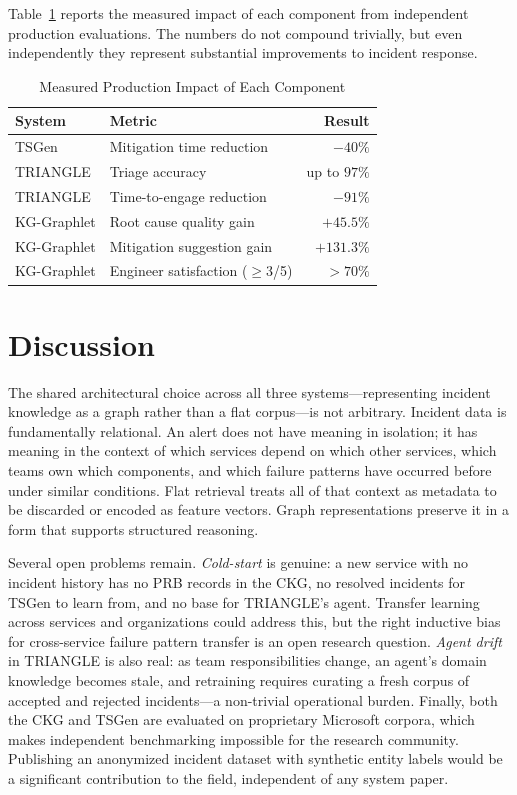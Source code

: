 \documentclass[conference]{IEEEtran}
\begin{document}
Table~\ref{tab:impact} reports the measured impact of each component from
independent production evaluations. The numbers do not compound trivially, but
even independently they represent substantial improvements to incident response.

\begin{table}[h]
\caption{Measured Production Impact of Each Component}
\label{tab:impact}
\centering
\begin{tabular}{lp{3.2cm}r}
\toprule
\textbf{System} & \textbf{Metric} & \textbf{Result} \\
\midrule
TSGen       & Mitigation time reduction  & $-40\%$ \\
TRIANGLE    & Triage accuracy            & up to $97\%$ \\
TRIANGLE    & Time-to-engage reduction   & $-91\%$ \\
KG-Graphlet & Root cause quality gain    & $+45.5\%$ \\
KG-Graphlet & Mitigation suggestion gain & $+131.3\%$ \\
KG-Graphlet & Engineer satisfaction ($\geq$3/5) & $>70\%$ \\
\bottomrule
\end{tabular}
\end{table}


\section{Discussion}

The shared architectural choice across all three systems---representing incident
knowledge as a graph rather than a flat corpus---is not arbitrary. Incident data
is fundamentally relational. An alert does not have meaning in isolation; it has
meaning in the context of which services depend on which other services, which
teams own which components, and which failure patterns have occurred before under
similar conditions. Flat retrieval treats all of that context as metadata to be
discarded or encoded as feature vectors. Graph representations preserve it in a
form that supports structured reasoning.

Several open problems remain. \textit{Cold-start} is genuine: a new service with
no incident history has no PRB records in the CKG, no resolved incidents for TSGen
to learn from, and no base for TRIANGLE's agent. Transfer learning across services
and organizations could address this, but the right inductive bias for
cross-service failure pattern transfer is an open research question.
\textit{Agent drift} in TRIANGLE is also real: as team responsibilities change,
an agent's domain knowledge becomes stale, and retraining requires curating a fresh
corpus of accepted and rejected incidents---a non-trivial operational burden.
Finally, both the CKG and TSGen are evaluated on proprietary Microsoft corpora,
which makes independent benchmarking impossible for the research community.
Publishing an anonymized incident dataset with synthetic entity labels would be a
significant contribution to the field, independent of any system paper.
\end{document}
